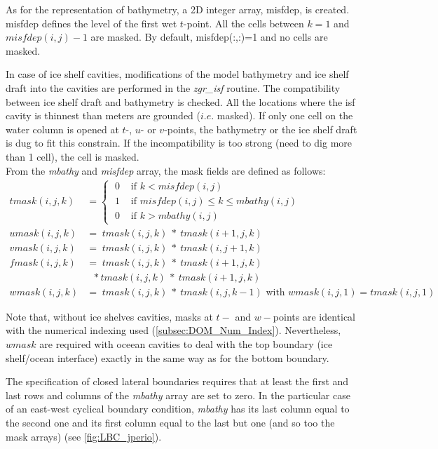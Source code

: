 \documentclass[../tex_main/NEMO_manual]{subfiles}
\begin{document}
As for the representation of bathymetry, a 2D integer array, misfdep, is created. 
misfdep defines the level of the first wet $t$-point. All the cells between $k=1$ and $misfdep(i,j)-1$ are masked. 
By default, misfdep(:,:)=1 and no cells are masked.

In case of ice shelf cavities, modifications of the model bathymetry and ice shelf draft into 
the cavities are performed in the \textit{zgr\_isf} routine. The compatibility between ice shelf draft and bathymetry is checked. 
All the locations where the isf cavity is thinnest than  meters are grounded ($i.e.$ masked). 
If only one cell on the water column is opened at $t$-, $u$- or $v$-points, the bathymetry or the ice shelf draft is dug to fit this constrain.
If the incompatibility is too strong (need to dig more than 1 cell), the cell is masked.\\ 

From the \textit{mbathy} and \textit{misfdep} array, the mask fields are defined as follows:
\begin{align*}
tmask(i,j,k) &= \begin{cases}   \; 0&   \text{ if $k < misfdep(i,j) $ } \\
                                \; 1&   \text{ if $misfdep(i,j) \leq k\leq mbathy(i,j)$  }    \\
                                \; 0&   \text{ if $k > mbathy(i,j)$  }    \end{cases}     \\
umask(i,j,k) &=         \; tmask(i,j,k) \ * \ tmask(i+1,j,k)	\\
vmask(i,j,k) &=         \; tmask(i,j,k) \ * \ tmask(i,j+1,k)	\\
fmask(i,j,k) &=         \; tmask(i,j,k) \ * \ tmask(i+1,j,k)	\\
             &    \ \ \, * tmask(i,j,k) \ * \ tmask(i+1,j,k) \\
wmask(i,j,k) &=         \; tmask(i,j,k) \ * \ tmask(i,j,k-1) \text{ with } wmask(i,j,1) = tmask(i,j,1) 
\end{align*}

Note that, without ice shelves cavities, masks at $t-$ and $w-$points are identical with 
the numerical indexing used (\autoref{subsec:DOM_Num_Index}). Nevertheless, $wmask$ are required 
with oceean cavities to deal with the top boundary (ice shelf/ocean interface) 
exactly in the same way as for the bottom boundary. 

The specification of closed lateral boundaries requires that at least the first and last 
rows and columns of the \textit{mbathy} array are set to zero. In the particular 
case of an east-west cyclical boundary condition, \textit{mbathy} has its last 
column equal to the second one and its first column equal to the last but one 
(and so too the mask arrays) (see \autoref{fig:LBC_jperio}).
\end{document}
